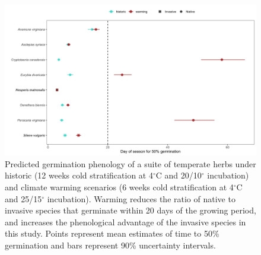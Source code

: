 \documentclass{article}[11pt]
\begin{document}
\begin{figure}[h!]
    \centering
\includegraphics[width=\textwidth]{..//figure/commchange.jpeg}
   \caption{Predicted germination phenology of a suite of temperate herbs under historic (12 weeks cold stratification at 4$^{\circ}$C and  20/10$^{\circ}$ incubation)  and climate warming scenarios (6 weeks cold stratification at 4$^{\circ}$C and  25/15$^{\circ}$ incubation).  Warming reduces the ratio of native to invasive species that germinate within 20 days of the growing period, and increases the phenological advantage of the invasive species in this study. Points represent mean estimates of time to 50\% germination and bars represent 90\% uncertainty intervals. } 
   \label{fig:comm}
\end{figure}
\end{document}
